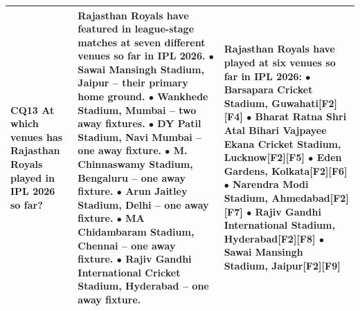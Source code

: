 \begin{longtable}{p{1.9cm}p{6.8cm}p{6.8cm}}
\textbf{CQ13} \newline \scriptsize At which venues has Rajasthan Royals played in IPL 2026 so far? & \scriptsize Rajasthan Royals have featured in league-stage matches at seven different venues so far in IPL 2026. \newline \quad$\bullet$ Sawai Mansingh Stadium, Jaipur -- their primary home ground. \newline \quad$\bullet$ Wankhede Stadium, Mumbai -- two away fixtures. \newline \quad$\bullet$ DY Patil Stadium, Navi Mumbai -- one away fixture. \newline \quad$\bullet$ M. Chinnaswamy Stadium, Bengaluru -- one away fixture. \newline \quad$\bullet$ Arun Jaitley Stadium, Delhi -- one away fixture. \newline \quad$\bullet$ MA Chidambaram Stadium, Chennai -- one away fixture. \newline \quad$\bullet$ Rajiv Gandhi International Cricket Stadium, Hyderabad -- one away fixture. & \scriptsize Rajasthan Royals have played at six venues so far in IPL 2026: \newline \quad$\bullet$ Barsapara Cricket Stadium, Guwahati\textsf{[F2]}\textsf{[F4]} \newline \quad$\bullet$ Bharat Ratna Shri Atal Bihari Vajpayee Ekana Cricket Stadium, Lucknow\textsf{[F2]}\textsf{[F5]} \newline \quad$\bullet$ Eden Gardens, Kolkata\textsf{[F2]}\textsf{[F6]} \newline \quad$\bullet$ Narendra Modi Stadium, Ahmedabad\textsf{[F2]}\textsf{[F7]} \newline \quad$\bullet$ Rajiv Gandhi International Stadium, Hyderabad\textsf{[F2]}\textsf{[F8]} \newline \quad$\bullet$ Sawai Mansingh Stadium, Jaipur\textsf{[F2]}\textsf{[F9]} \\ \midrule
\end{longtable}
